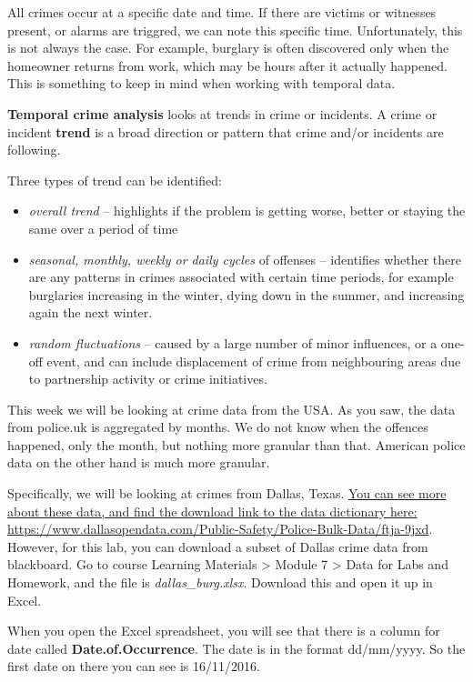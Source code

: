 \documentclass[
]{book}
\providecommand{\tightlist}{%
  \setlength{\itemsep}{0pt}\setlength{\parskip}{0pt}}
\begin{document}
All crimes occur at a specific date and time. If there are victims or witnesses present, or alarms are triggred, we can note this specific time. Unfortunately, this is not always the case. For example, burglary is often discovered only when the homeowner returns from work, which may be hours after it actually happened. This is something to keep in mind when working with temporal data.

\textbf{Temporal crime analysis} looks at trends in crime or incidents. A crime or incident \textbf{trend} is a broad direction or pattern that crime and/or incidents are following.

Three types of trend can be identified:

\begin{itemize}
\tightlist
\item
  \emph{overall trend} -- highlights if the problem is getting worse, better or staying the same over a period of time
\item
  \emph{seasonal, monthly, weekly or daily cycles} of offenses -- identifies whether there are any patterns in crimes associated with certain time periods, for example burglaries increasing in the winter, dying down in the summer, and increasing again the next winter.
\item
  \emph{random fluctuations} -- caused by a large number of minor influences, or a one-off event, and can include displacement of crime from neighbouring areas due to partnership activity or crime initiatives.
\end{itemize}

This week we will be looking at crime data from the USA. As you saw, the data from police.uk is aggregated by months. We do not know when the offences happened, only the month, but nothing more granular than that. American police data on the other hand is much more granular.

Specifically, we will be looking at crimes from Dallas, Texas. \href{https://www.dallasopendata.com/Public-Safety/Police-Bulk-Data/ftja-9jxd}{You can see more about these data, and find the download link to the data dictionary here: https://www.dallasopendata.com/Public-Safety/Police-Bulk-Data/ftja-9jxd}. However, for this lab, you can download a subset of Dallas crime data from blackboard. Go to course Learning Materials \textgreater{} Module 7 \textgreater{} Data for Labs and Homework, and the file is \emph{dallas\_burg.xlsx}. Download this and open it up in Excel.

When you open the Excel spreadsheet, you will see that there is a column for date called \textbf{Date.of.Occurrence}. The date is in the format dd/mm/yyyy. So the first date on there you can see is 16/11/2016.
\end{document}
